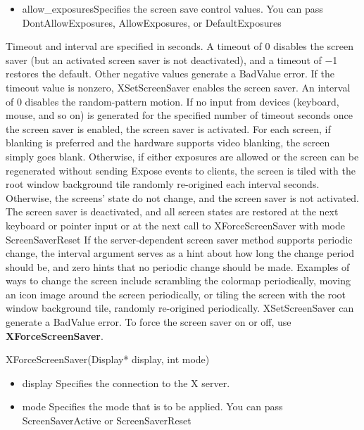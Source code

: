 \documentclass{report}
\begin{document}
\begin{itemize}
\begin{itemize}
                \item allow\_exposuresSpecifies the screen save control values. You can pass DontAllowExposures, AllowExposures, or DefaultExposures
            \end{itemize}
            Timeout and interval are specified in seconds. A timeout of 0 disables the screen saver (but an activated screen saver is not deactivated), and a timeout of −1 restores the default. Other negative values generate a BadValue error. If the timeout value is nonzero, XSetScreenSaver enables the screen saver. An interval of 0 disables the random-pattern motion. If no input from devices (keyboard, mouse, and so on) is generated for the specified number of timeout seconds once the screen saver is enabled, the screen saver is activated.
            \bigbreak \noindent 
            For each screen, if blanking is preferred and the hardware supports video blanking, the screen simply goes blank. Otherwise, if either exposures are allowed or the screen can be regenerated without sending Expose events to clients, the screen is tiled with the root window background tile randomly re-origined each interval seconds. Otherwise, the screens’ state do not change, and the screen saver is not activated. The screen saver is deactivated, and all screen states are restored at the next keyboard or pointer input or at the next call to XForceScreenSaver with mode ScreenSaverReset
            \bigbreak \noindent 
            If the server-dependent screen saver method supports periodic change, the interval argument serves as a hint about how long the change period should be, and zero hints that no periodic change should be made. Examples of ways to change the screen include scrambling the colormap periodically, moving an icon image around the screen periodically, or tiling the screen with the root window background tile, randomly re-origined periodically.
            \bigbreak \noindent 
            XSetScreenSaver can generate a BadValue error.
            \bigbreak \noindent 
            To force the screen saver on or off, use \textbf{XForceScreenSaver}.
            \bigbreak \noindent 
            \begin{cppcode}
            XForceScreenSaver(Display* display, int mode)
            \end{cppcode}
            \begin{itemize}
                \item display Specifies the connection to the X server.
                \item mode Specifies the mode that is to be applied. You can pass ScreenSaverActive or ScreenSaverReset

\end{itemize}
\end{itemize}
\end{document}
